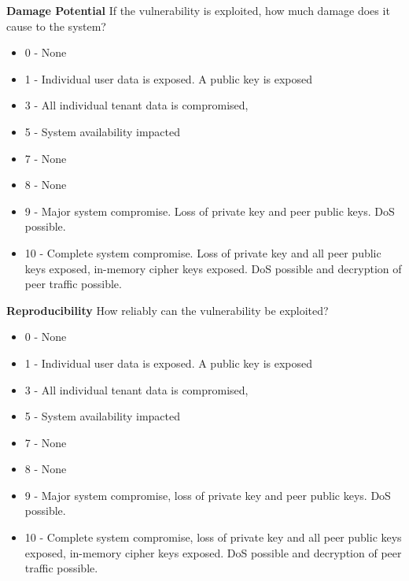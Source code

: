 \documentclass [11pt, proquest] {uwthesis}[2020/02/24]
\begin{document}
\textbf{Damage Potential}
If the vulnerability is exploited, how much damage does it cause to the system?
\begin{small}
\begin{itemize}
\label{dread:damage}
	\item 0 - None
    \item 1 - Individual user data is exposed. A public key is exposed
    \item 3 - All individual tenant data is compromised, 
    \item 5 - System availability impacted
    \item 7 - None
    \item 8 - None
    \item 9 - Major system compromise. Loss of private key and peer public keys. DoS possible.
    \item 10 - Complete system compromise. Loss of private key and all peer public keys exposed, in-memory cipher keys exposed. DoS possible and decryption of peer traffic possible.
\end{itemize}
\end{small}
\bigskip

\begin{small}
\textbf{Reproducibility}
How reliably can the vulnerability be exploited?
\begin{itemize}
\label{dread:repro}
	\item 0 - None
    \item 1 - Individual user data is exposed. A public key is exposed
    \item 3 - All individual tenant data is compromised, 
    \item 5 - System availability impacted
    \item 7 - None
    \item 8 - None
    \item 9 - Major system compromise, loss of private key and peer public keys. DoS possible.
    \item 10 - Complete system compromise, loss of private key and all peer public keys exposed, in-memory cipher keys exposed. DoS possible and decryption of peer traffic possible.
\end{itemize}
\end{small}
\bigskip
\end{document}
